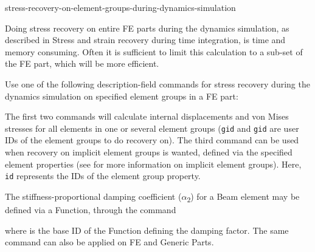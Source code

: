 

           {stress-recovery-on-element-groups-during-dynamics-simulation}

Doing stress recovery on entire FE parts during the dynamics simulation,
as described in
{Stress and strain recovery during time integration},
is time and memory consuming. Often it is sufficient to limit this
calculation to a sub-set of the FE part, which will be more efficient.

Use one of the following description-field commands for stress recovery
during the dynamics simulation on specified element groups in a FE part:

\medskip
{}


\medskip

\noindent
The first two commands will calculate internal displacements and von Mises
stresses for all elements in one or several element groups ({\tt gid} and
{\tt gid} are user IDs of the element groups to do recovery on).
The third command can be used when recovery on implicit element groups is
wanted, defined via the specified element properties (see
 for more information
on implicit element groups).
Here, {\tt id} represents the IDs of the element group property.




The stiffness-proportional damping coefficient ($\alpha$\textsubscript{2}) for
a Beam element may be defined via a Function, through the command


\noindent
where {\tt{}} is the base ID of the Function defining the damping
factor. The same command can also be applied on FE and Generic Parts.



